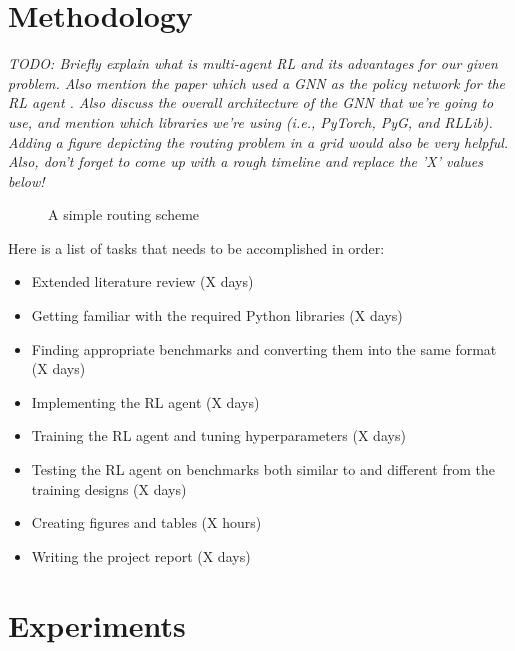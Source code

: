 \documentclass[letterpaper]{article}
\begin{document}
    
\section{Methodology}
\label{method}


{\it TODO: Briefly explain what is multi-agent RL and its advantages for our given problem. Also mention the paper which used a GNN as the policy network for the RL agent \cite{Almasan2022}. Also discuss the overall architecture of the GNN that we're going to use, and mention which libraries we're using (i.e., PyTorch, PyG, and RLLib). Adding a figure depicting the routing problem in a grid would also be very helpful. \\
Also, don't forget to come up with a rough timeline and replace the 'X' values below!}  \\

\begin{figure}[htb]
    \centering
    \fbox{\rule[-.5cm]{0cm}{4cm} \rule[-.5cm]{4cm}{0cm}}
    \caption{A simple routing scheme}
\end{figure}

Here is a list of tasks that needs to be accomplished in order:

\begin{itemize}
    \item Extended literature review (X days)
    
    \item Getting familiar with the required Python libraries (X days)
    
    \item Finding appropriate benchmarks and converting them into the same format (X days)
    
    \item Implementing the RL agent (X days)
    
    \item Training the RL agent and tuning hyperparameters (X days)
    
    \item Testing the RL agent on benchmarks both similar to and different from the training designs (X days)
    
    \item Creating figures and tables (X hours)
    
    \item Writing the project report (X days)
\end{itemize}
    
    
\section{Experiments}
\end{document}
